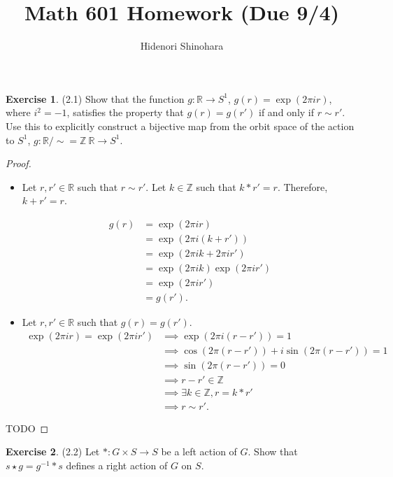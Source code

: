 \documentclass[12pt, psamsfonts]{amsart}
\theoremstyle{definition}
\newtheorem*{exer}{Exercise}
\theoremstyle{remark}
\numberwithin{equation}{section}
\begin{document}
\title{Math 601 Homework (Due 9/4)}
\author{Hidenori Shinohara}
\maketitle

\begin{exer}{(2.1)}
  Show that the function $g: \mathbb{R} \rightarrow S^1$, $g(r) = \exp(2\pi ir)$, where $i^2 = -1$, satisfies the property that $g(r) = g(r')$ if and only if $r \sim r'$.
  Use this to explicitly construct a bijective map from the orbit space of the action to $S^1$, $g: \mathbb{R} / \sim= \mathbb{Z} \ \mathbb{R} \rightarrow S^1$.
\end{exer}

\begin{proof}
$ $
  \begin{itemize}
    \item
      Let $r, r' \in \mathbb{R}$ such that $r \sim r'$.
      Let $k \in \mathbb{Z}$ such that $k * r' = r$.
      Therefore, $k + r' = r$.

      \begin{align*}
        g(r)
          &= \exp(2\pi i r) \\
          &= \exp(2\pi i (k + r')) \\
          &= \exp(2\pi i k + 2\pi i r') \\
          &= \exp(2\pi i k)\exp(2\pi i r') \\
          &= \exp(2\pi i r') \\
          &= g(r').
      \end{align*}
    \item
      Let $r, r' \in \mathbb{R}$ such that $g(r) = g(r')$.
      \begin{align*}
        \exp(2\pi ir) = \exp(2 \pi ir')
          &\implies \exp(2\pi i(r - r')) = 1 \\
          &\implies \cos(2\pi (r - r')) + i\sin (2\pi (r - r')) = 1 \\
          &\implies \sin (2\pi (r - r')) = 0 \\
          &\implies r - r' \in \mathbb{Z} \\
          &\implies \exists k \in \mathbb{Z},  r = k * r' \\
          &\implies r \sim r'.
      \end{align*}
  \end{itemize}
  TODO
\end{proof}

\begin{exer}{(2.2)}
  Let $*: G \times S \rightarrow S$ be a left action of $G$.
  Show that $s \star g = g^{-1} * s$ defines a right action of $G$ on $S$.
\end{exer}
\end{document}
